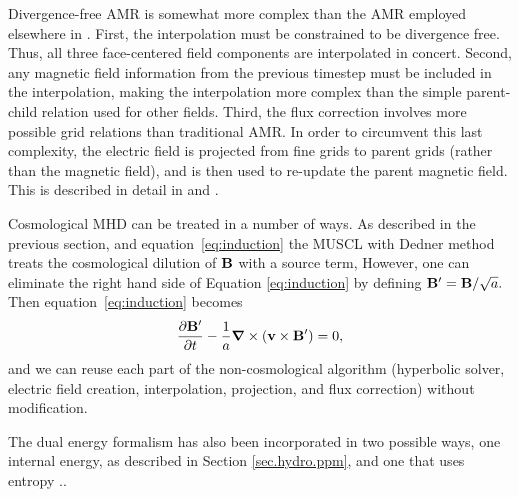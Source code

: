 Divergence-free AMR is somewhat more complex than the AMR employed
elsewhere in \enzo.  First, the interpolation must be constrained to be
divergence free.  Thus, all three face-centered field components are
interpolated in concert.  Second, any magnetic field information from
the previous timestep must be included in the interpolation, making the
interpolation more complex than the simple parent-child relation used
for other fields.  Third, the flux correction involves more possible
grid relations than traditional AMR.  In order to circumvent this last
complexity, the electric field is projected from fine grids to parent
grids (rather than the magnetic field), and is then used to re-update
the parent magnetic field.  This is described in detail in
\citet{Balsara99} and \citet{Collins10}.

Cosmological MHD can be treated in a number of ways.  As described in 
the previous section, and equation~\ref{eq:induction} the MUSCL with Dedner
method treats the cosmological dilution of
$\mathbf{B}$ with a source term,  However, one can eliminate the right hand side of Equation 
\ref{eq:induction} by defining
$\mathbf{B}^\prime = \mathbf{B} / \sqrt{a}.$
Then equation~\ref{eq:induction} becomes
$$ 
\frac{\partial \mathbf{B}^\prime}{\partial t} - \frac{1}{a}  \bm{\nabla} \times (\mathbf{v} \times
\mathbf{B}^\prime)  = 0, \label{eq:induction_cosmo_prime_nosource}
$$
and we can reuse each part of the non-cosmological algorithm (hyperbolic solver,
electric field creation, interpolation, projection, and flux correction) without
modification.  

The dual energy formalism has also been incorporated in two possible ways, one internal
energy, as described in Section \ref{sec.hydro.ppm}, and one that
uses entropy \cite{TVD93, Collins10}..  

%

